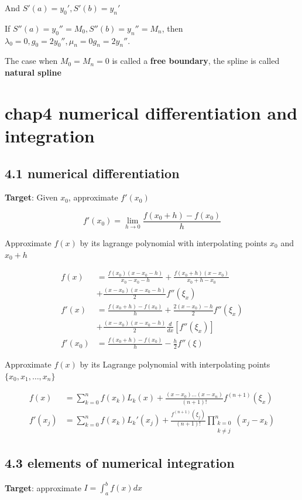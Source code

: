 \documentclass[11pt]{article}
\begin{document}
And  \(S'(a)=y_0',S'(b)=y_n'\)

If \(S''(a)=y_0''=M_0,S''(b)=y_n''=M_n\), then \(\lambda_0=0,g_0=2y_0'',\mu_n=0
   g_n=2y_n''\).

The case when \(M_0=M_n=0\) is called a \textbf{free boundary}, the spline is called
\textbf{natural spline}
\section{chap4 numerical differentiation and integration}
\label{sec:org7421b8c}
\subsection{4.1 numerical differentiation}
\label{sec:org67d489e}
\textbf{Target}: Given \(x_0\), approximate \(f'(x_0)\)

\begin{equation*}
f'(x_0)=\lim\limits_{h\to0}\frac{f(x_0+h)-f(x_0)}{h}
\end{equation*}

Approximate \(f(x)\) by its lagrange polynomial with interpolating points \(x_0\)
and \(x_0+h\)

\begin{align*}
f(x)&=\frac{f(x_0)(x-x_0-h)}{x_0-x_0-h}+\frac{f(x_0+h)(x-x_0)}{x_0+h-x_0}\\
&+\frac{(x-x_0)(x-x_0-h)}{2}f''(\xi_x)\\
f'(x)&=\frac{f(x_0+h)-f(x_0)}{h}+\frac{2(x-x_0)-h}{2}f''(\xi_x)\\
&+\frac{(x-x_0)(x-x_0-h)}{2}\frac{d}{dx}[f''(\xi_x)]\\
f'(x_0)&=\frac{f(x_0+h)-f(x_0)}{h}-\frac{h}{2}f''(\xi)
\end{align*}

Approximate \(f(x)\) by its Lagrange polynomial with interpolating points
\(\{x_0,x_1,\dots,x_n\}\)

\begin{align*}
f(x)&=\displaystyle\sum_{k=0}^nf(x_k)L_k(x)+\frac{(x-x_0)\dots(x-x_n)}{(n+1)!}
f^{(n+1)}(\xi_x)\\
f'(x_j)&=\displaystyle\sum_{k=0}^nf(x_k)L_k'(x_j)+\frac{f^{(n+1)}(\xi_j)}{(n+1)!}
\displaystyle\prod_{\substack{k=0\\k\neq j}}^n(x_j-x_k)
\end{align*}
\subsection{4.3 elements of numerical integration}
\label{sec:orgdf91a2a}
\textbf{Target}: approximate \(I=\int_a^bf(x)dx\)
\end{document}
